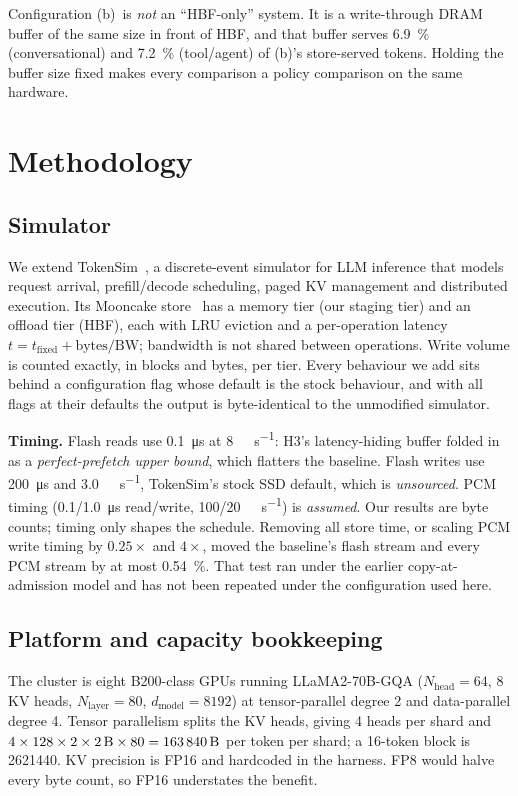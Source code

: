 \documentclass[conference]{IEEEtran}
\newcommand{\cfgb}{\textsf{(b)}}
\begin{document}
Configuration \cfgb\ is \emph{not} an ``HBF-only'' system. It is a write-through
DRAM buffer of the same size in front of HBF, and that buffer serves
\SI{6.9}{\percent} (conversational) and \SI{7.2}{\percent} (tool/agent) of
\cfgb's store-served tokens. Holding the buffer size fixed makes every
comparison a policy comparison on the same hardware.

\section{Methodology}\label{sec:method}

\subsection{Simulator}
We extend TokenSim~\cite{tokensim}, a discrete-event simulator for LLM inference
that models request arrival, prefill/decode scheduling, paged KV management and
distributed execution. Its Mooncake store~\cite{mooncake} has a memory tier
(our staging tier) and an offload tier (HBF), each with LRU eviction and a
per-operation latency $t = t_\text{fixed} + \text{bytes}/\text{BW}$; bandwidth
is not shared between operations. Write volume is counted exactly, in blocks
and bytes, per tier. Every behaviour we add sits behind a configuration flag
whose default is the stock behaviour, and with all flags at their defaults the
output is byte-identical to the unmodified simulator.

\textbf{Timing.} Flash reads use \SI{0.1}{\micro\second} at
\SI{8}{\tera\byte\per\second}: H3's latency-hiding buffer folded in as a
\emph{perfect-prefetch upper bound}, which flatters the baseline. Flash writes
use \SI{200}{\micro\second} and \SI{3.0}{\gibi\byte\per\second}, TokenSim's
stock SSD default, which is \emph{unsourced}. PCM timing
(\num{0.1}/\SI{1.0}{\micro\second} read/write,
\num{100}/\SI{20}{\gibi\byte\per\second}) is \emph{assumed}. Our results are
byte counts; timing only shapes the schedule. Removing all store time, or
scaling PCM write timing by $0.25\times$ and $4\times$, moved the baseline's
flash stream and every PCM stream by at most \SI{0.54}{\percent}. That test ran
under the earlier copy-at-admission model and has not been repeated under the
configuration used here.

\subsection{Platform and capacity bookkeeping}
The cluster is eight B200-class GPUs running LLaMA2-70B-GQA
($N_\text{head}=64$, 8 KV heads, $N_\text{layer}=80$, $d_\text{model}=8192$) at
tensor-parallel degree 2 and data-parallel degree 4. Tensor parallelism splits
the KV heads, giving 4 heads per shard and
$4 \times 128 \times 2 \times \SI{2}{\byte} \times 80 = \SI{163840}{\byte}$
per token per shard; a 16-token block is \SI{2621440}{\byte}. KV precision is
FP16 and hardcoded in the harness. FP8 would halve every byte count, so FP16
understates the benefit.
\end{document}
